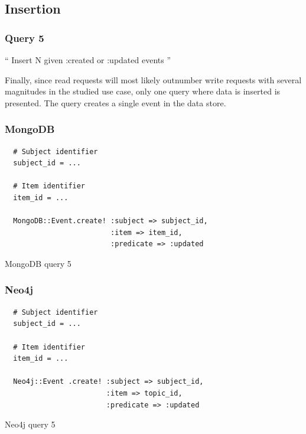 \subsection{Insertion}
\label{subsec:insertion}

\subsubsection{Query 5}
\label{subsubsec:query-5}

``
Insert N given :created or :updated events
''

Finally, since read requests will most likely outnumber write requests with several magnitudes in the studied use case, only one query where data is inserted is presented.
The query creates a single event in the data store.

\subsubsection*{MongoDB}

\begin{listing}[H]
  \begin{verbatim}
  # Subject identifier
  subject_id = ...

  # Item identifier
  item_id = ...

  MongoDB::Event.create! :subject => subject_id,
                         :item => item_id,
                         :predicate => :updated
  \end{verbatim}

  \caption{MongoDB query 5}
  \label{lst:mongodb-query-5}
\end{listing}

\subsubsection*{Neo4j}

\begin{listing}[H]
  \begin{verbatim}
  # Subject identifier
  subject_id = ...

  # Item identifier
  item_id = ...

  Neo4j::Event .create! :subject => subject_id,
                        :item => topic_id,
                        :predicate => :updated
  \end{verbatim}

  \caption{Neo4j query 5}
  \label{lst:neo4j-query-5}
\end{listing}

